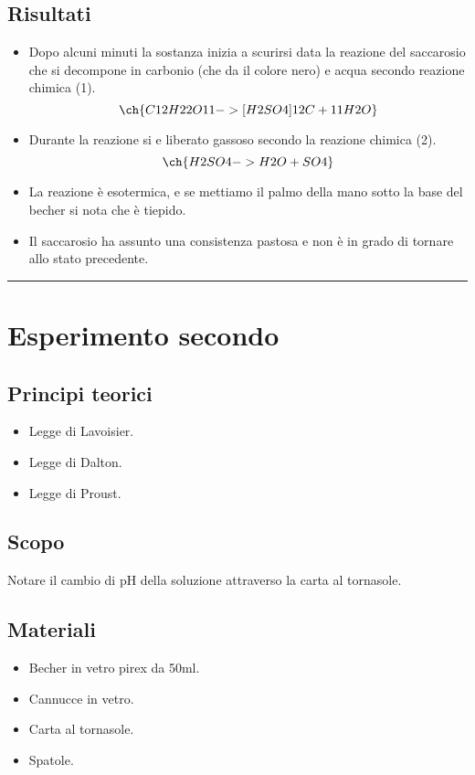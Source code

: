 \documentclass[a4paper,10pt]{article}
\begin{document}
	\subsection{Risultati}
	\begin{itemize}
		\item Dopo alcuni minuti la sostanza inizia a scurirsi data la reazione del saccarosio che si decompone in carbonio (che da il colore nero) e acqua secondo reazione chimica (1).
		\begin{equation}
			\ch{C12H22O11 ->[ H2SO4 ] 12 C + 11 H2O}
		\end{equation}
		
		\item Durante la reazione si e liberato  gassoso secondo la reazione chimica (2).
		\begin{equation}
			\ch{H2SO4 -> H2O + SO4}
		\end{equation}
		\item La reazione è esotermica, e se mettiamo il palmo della mano sotto la          base del becher si nota che è tiepido.
		\item Il saccarosio ha assunto una consistenza pastosa e non è in grado di tornare allo stato precedente.
	\end{itemize}
	
	
	
	\par\noindent\rule{\textwidth}{0.5pt}
	
	
	
	\section{Esperimento secondo}
	\subsection{Principi teorici}
	\begin{itemize}
		\item Legge di Lavoisier.
		\item Legge di Dalton.
		\item Legge di Proust.
	\end{itemize}
	\subsection{Scopo}
	Notare il cambio di pH della soluzione attraverso la carta al tornasole.
	\subsection{Materiali}
	\begin{itemize}
		\item Becher in vetro pirex da 50ml.
		\item Cannucce in vetro.
		\item Carta al tornasole.
		\item Spatole.
	\end{itemize}
\end{document}
